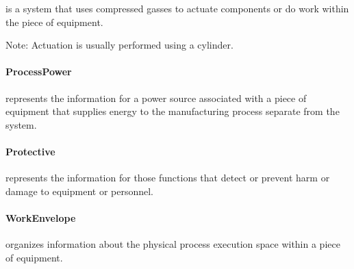  is a system that uses compressed gasses to actuate components or do work within the piece of equipment.

Note: Actuation is usually performed using a cylinder.



\paragraph{ProcessPower}\mbox{}
\label{sec:ProcessPower}


 represents the information for a power source associated with a piece of equipment that supplies energy to the manufacturing process separate from the  system.



\paragraph{Protective}\mbox{}
\label{sec:Protective}


 represents the information for those functions that detect or prevent harm or damage to equipment or personnel.



\paragraph{WorkEnvelope}\mbox{}
\label{sec:WorkEnvelope}


 organizes information about the physical process execution space within a piece of equipment.


